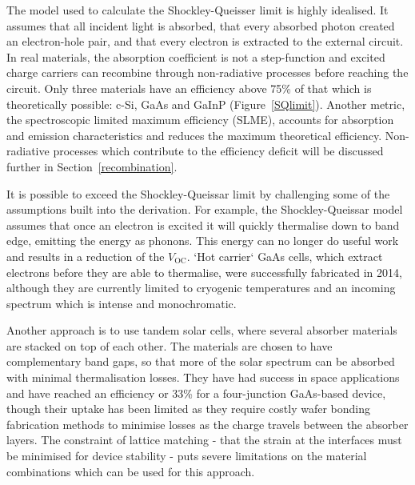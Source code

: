 The model used to calculate the Shockley-Queisser limit is highly idealised. It assumes that all incident light is absorbed, that every absorbed photon created an electron-hole pair, and that every electron is extracted to the external circuit. In real materials, the absorption coefficient is not a step-function and excited charge carriers can recombine through non-radiative processes before reaching the circuit. Only three materials have an efficiency above 75\% of that which is theoretically possible: c-Si, GaAs and GaInP (Figure\ \ref{SQlimit}). Another metric, the spectroscopic limited maximum efficiency (SLME), accounts for absorption and emission characteristics and reduces the maximum theoretical efficiency.\autocite{Yu2012} Non-radiative processes which contribute to the efficiency deficit will be discussed further in Section\ \ref{recombination}.


It is possible to exceed the Shockley-Queissar limit by challenging some of the assumptions built into the derivation. For example, the Shockley-Queissar model assumes that once an electron is excited it will quickly thermalise down to band edge, emitting the energy as phonons. This energy can no longer do useful work and results in a reduction of the $V_{\text{OC}}$. `Hot carrier` GaAs cells, which extract electrons before they are able to thermalise, were successfully fabricated in 2014, although they are currently limited to cryogenic temperatures and an incoming spectrum which is intense and monochromatic. 

Another approach is to use tandem solar cells, where several absorber materials are stacked on top of each other. The materials are chosen to have complementary band gaps, so that more of the solar spectrum can be absorbed with minimal thermalisation losses. They have had success in space applications and have reached an efficiency or 33\% for a four-junction GaAs-based device, though their uptake has been limited as they require costly wafer bonding fabrication methods to minimise losses as the charge travels between the absorber layers. The constraint of lattice matching - that the strain at the interfaces must be minimised for device stability - puts severe limitations on the material combinations which can be used for this approach. 


